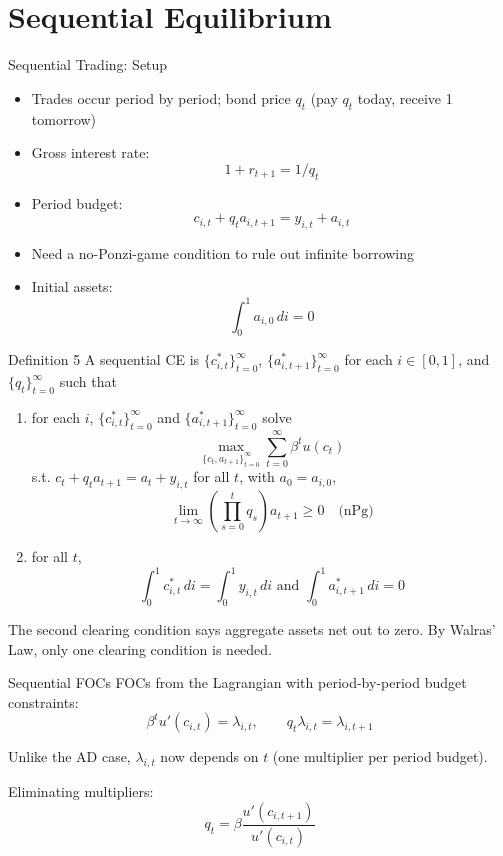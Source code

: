 \documentclass[blue]{beamer}
\begin{document}
\section{Sequential Equilibrium}

\begin{frame}{Sequential Trading: Setup}
	\begin{itemize}
		\item Trades occur period by period; bond price $q_t$ (pay $q_t$ today, receive 1 tomorrow)
		\item Gross interest rate: 
		$$
		1 + r_{t+1} = 1/q_t
		$$
		\item Period budget: 
		$$
		c_{i,t} + q_t a_{i,t+1} = y_{i,t} + a_{i,t}
		$$
		\item Need a no-Ponzi-game condition to rule out infinite borrowing
		\item Initial assets: 
		$$
		\int_0^1 a_{i,0} \, di = 0
		$$
	\end{itemize}
\end{frame}

\begin{frame}{Definition 5}
	A sequential CE is $\{c_{i,t}^*\}_{t=0}^{\infty}$, $\{a_{i,t+1}^*\}_{t=0}^{\infty}$ for each $i \in [0,1]$, and $\{q_t\}_{t=0}^{\infty}$ such that
	
	\begin{enumerate}
		\item for each $i$, $\{c_{i,t}^*\}_{t=0}^{\infty}$ and $\{a_{i,t+1}^*\}_{t=0}^{\infty}$ solve
		\[
		\max_{\{c_t, a_{t+1}\}_{t=0}^{\infty}} \sum_{t=0}^{\infty} \beta^t u(c_t)
		\]
		s.t. $c_t + q_t a_{t+1} = a_t + y_{i,t}$ for all $t$, with $a_0 = a_{i,0}$,
		\[
		\lim_{t \to \infty} \left(\prod_{s=0}^{t} q_s\right) a_{t+1} \geq 0 \quad \text{(nPg)}
		\]
		
		\item for all $t$, 
		$$
		\int_0^1 c_{i,t}^* \, di = \int_0^1 y_{i,t} \, di \text{ and } \int_0^1 a_{i,t+1}^* \, di = 0
		$$
	\end{enumerate}
	
	\medskip
	The second clearing condition says aggregate assets net out to zero. By Walras' Law, only one clearing condition is needed.
\end{frame}

\begin{frame}{Sequential FOCs}
	FOCs from the Lagrangian with period-by-period budget constraints:
	\[
	\beta^t u'(c_{i,t}) = \lambda_{i,t}, \qquad q_t \lambda_{i,t} = \lambda_{i,t+1}
	\]
	
	Unlike the AD case, $\lambda_{i,t}$ now depends on $t$ (one multiplier per period budget).
	
	\bigskip
	Eliminating multipliers: 
	$$
	q_t = \beta \frac{u'(c_{i,t+1})}{u'(c_{i,t})}
	$$
\end{frame}
\end{document}
